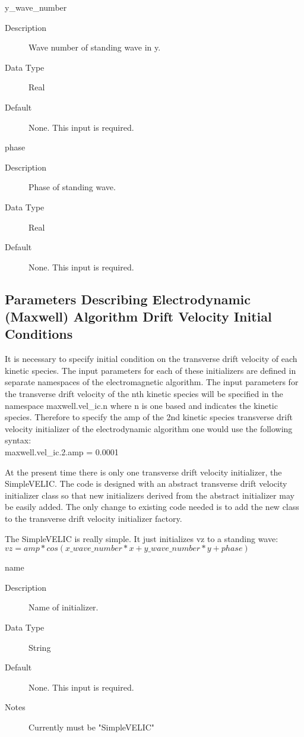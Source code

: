 \documentclass[11pt]{amsart}
\begin{document}
y\_wave\_number
\begin{description}
\item [Description] Wave number of standing wave in y.
\item [Data Type] Real
\item [Default] None.  This input is required.
\end{description}

phase
\begin{description}
\item [Description] Phase of standing wave.
\item [Data Type] Real
\item [Default] None.  This input is required.
\end{description}

\subsection*{Parameters Describing Electrodynamic (Maxwell) Algorithm Drift Velocity Initial Conditions}
It is necessary to specify initial condition on the transverse drift velocity
of each kinetic species.  The input parameters for each of these initializers
are defined in separate namespaces of the electromagnetic algorithm.  The input
parameters for the transverse drift velocity of the nth kinetic species will
be specified in the namespace maxwell.vel\_ic.n where n is one based and
indicates the kinetic species.  Therefore to specify the amp of the 2nd
kinetic species transverse drift velocity initializer of the electrodynamic
algorithm one would use the following syntax: \\
maxwell.vel\_ic.2.amp = 0.0001

At the present time there is only one transverse drift velocity initializer,
the SimpleVELIC.  The code is designed with an abstract transverse drift
velocity initializer class so that new initializers derived from the abstract
initializer may be easily added.  The only change to existing code needed is
to add the new class to the transverse drift velocity initializer factory.

The SimpleVELIC is really simple.  It just initializes vz to a standing wave: \\
\begin{math} vz = amp*cos(x\_wave\_number*x+y\_wave\_number*y+phase) \end{math}

name
\begin{description}
\item [Description] Name of initializer.
\item [Data Type] String
\item [Default] None.  This input is required.
\item [Notes] Currently must be "SimpleVELIC"
\end{description}
\end{document}
